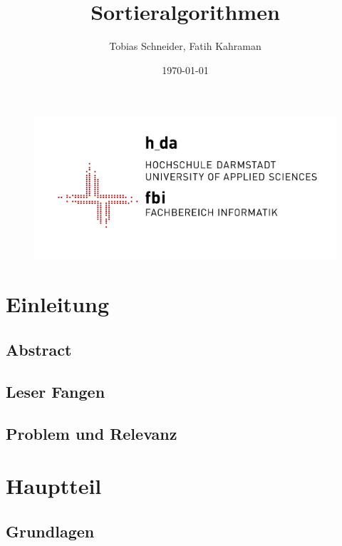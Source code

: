 \documentclass{article}
\title{Sortieralgorithmen}
\author{Tobias Schneider, Fatih Kahraman}
\date{\today}
\begin{document}
\begin{figure}
\includegraphics[scale = 1.5]{fbi_bild.png}
\end{figure}

\maketitle %
\thispagestyle{empty} %
\newpage{}

\tableofcontents{}%
\setcounter{page}{1} %
\newpage{}


\section{Einleitung}
\subsection{Abstract}
\subsection{Leser Fangen}
\subsection{Problem und Relevanz}

\section{Hauptteil}
\subsection{Grundlagen}
\end{document}
